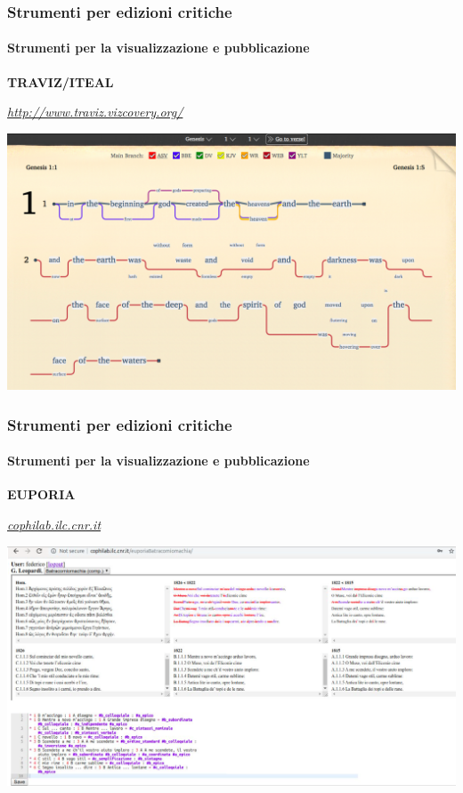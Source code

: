 \begin{frame}
    \frametitle{Strumenti per edizioni critiche}
    \framesubtitle{Strumenti per la visualizzazione e pubblicazione}
	\addtocounter{nframe}{1}
    \begin{center}
        \textbf{TRAVIZ/ITEAL}
    \end{center}
    \begin{center}
        \textit{\url{http://www.traviz.vizcovery.org/}}
	\end{center}
    \begin{center}
        \includegraphics[width=.95\textwidth]{imgs/traviz.png}
	\end{center}
\end{frame}

\begin{frame}
    \frametitle{Strumenti per edizioni critiche}
    \framesubtitle{Strumenti per la visualizzazione e pubblicazione}
    \addtocounter{nframe}{1}
    
    \begin{center}
        \textbf{EUPORIA}
    \end{center}
    \begin{center}
        \textit{\url{cophilab.ilc.cnr.it}}
    \end{center}
    
    \begin{center}
        \includegraphics[width=.95\textwidth]{imgs/euporia.png}
	\end{center}
\end{frame}

